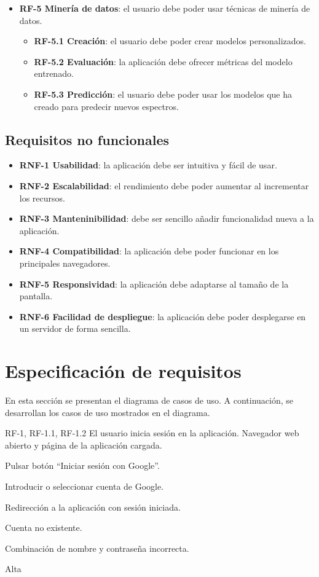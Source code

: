 \begin{itemize}
\begin{itemize}
	\end{itemize}
	\item \textbf{RF-5 Minería de datos}: el usuario debe poder usar técnicas 
	de minería de datos.
	\begin{itemize}
		\item \textbf{RF-5.1 Creación}: el usuario debe poder crear modelos 
		personalizados.
		\item \textbf{RF-5.2 Evaluación}: la aplicación debe ofrecer métricas 
		del modelo entrenado.
		\item \textbf{RF-5.3 Predicción}: el usuario debe poder usar los 
		modelos que ha creado para predecir nuevos espectros.
	\end{itemize}
\end{itemize}

\subsection{Requisitos no funcionales}

	\begin{itemize}
	\item \textbf{RNF-1 Usabilidad}: la aplicación debe ser intuitiva y fácil 
	de usar.
	\item \textbf{RNF-2 Escalabilidad}: el rendimiento debe poder aumentar al 
	incrementar los recursos.
	\item \textbf{RNF-3 Manteninibilidad}: debe ser sencillo añadir 
	funcionalidad nueva a la aplicación.
	\item \textbf{RNF-4 Compatibilidad}: la aplicación debe poder funcionar en 
	los principales navegadores.
	\item \textbf{RNF-5 Responsividad}: la aplicación debe adaptarse al tamaño 
	de la pantalla.
	\item \textbf{RNF-6 Facilidad de despliegue}: la aplicación debe poder 
	desplegarse en un servidor de forma sencilla.
	\end{itemize}

\section{Especificación de requisitos}

En esta sección se presentan el diagrama de casos de uso. A continuación, se 
desarrollan los casos de uso mostrados en el diagrama.


{RF-1, RF-1.1, RF-1.2}
{El usuario inicia sesión en la aplicación.}
{Navegador web abierto y página de la aplicación cargada.}
{
	\item Pulsar botón ``Iniciar sesión con Google''.
	\item Introducir o seleccionar cuenta de Google.
}
{Redirección a la aplicación con sesión iniciada.}
{	\item Cuenta no existente.
	\item Combinación de nombre y contraseña incorrecta.
}
{Alta}

